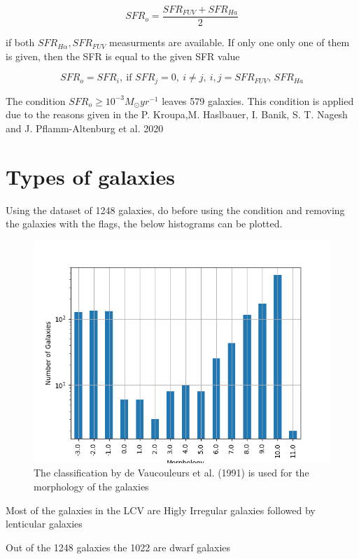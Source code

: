 \documentclass[a4paper]{article}
\begin{document}
$$
    SFR_o=\frac{SFR_{FUV}+SFR_{Ha}}{2}
$$

if both \(SFR_{H\alpha},SFR_{FUV}\) measurments are available. If only one only one of them is given, then the SFR is equal to the given SFR value

$$
    SFR_o=SFR_i,\ \text{if } SFR_j=0,\ i\neq j,\ i,j=SFR_{FUV},\, SFR_{Ha}
$$

The condition \(SFR_o\geq 10^{-3}M_\odot yr^{-1}\) leaves 579 galaxies. This condition is applied due to the reasons given in the P. Kroupa,M. Haslbauer, I. Banik, S. T. Nagesh and J. Pflamm-Altenburg et al. 2020 \cite{kroupaConstraintsStarFormation2020}

\section{Types of galaxies}
\label{sec:org6287ff6}

Using the dataset of 1248 galaxies, do before using the condition and removing the galaxies with the flags, the below histograms can be plotted.

\begin{figure}[htbp]
\centering
\includegraphics[width=.9\linewidth]{./graphs/hist-Type.png}
\caption{\label{Types of galaxies}The classification by de Vaucouleurs et al. (1991) is used for the morphology of the galaxies}
\end{figure}

Most of the galaxies in the LCV are Higly Irregular galaxies followed by lenticular galaxies

Out of the 1248 galaxies the 1022 are dwarf galaxies
\end{document}

